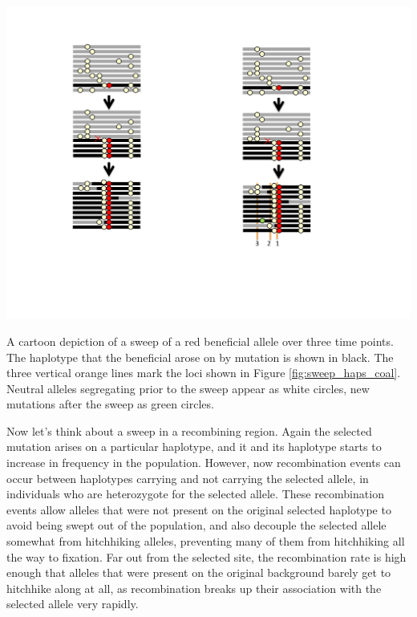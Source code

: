 \begin{marginfigure}
\begin{center}
\includegraphics[width= 0.5 \textwidth]{figures/Hitchhiking/recom_haps_sweep.pdf}
\end{center}
\caption{A cartoon depiction of a sweep of a red beneficial allele over three time points. The haplotype that the beneficial arose on by mutation is shown in black. The three vertical orange lines mark the loci shown in Figure \ref{fig:sweep_haps_coal}. Neutral alleles segregating prior to the sweep appear as white circles, new mutations after the sweep as green circles.} \label{fig:sweep_haps}
\end{marginfigure}
Now let's think about a sweep in a recombining region. Again the
selected mutation arises on a particular haplotype, and it and its
haplotype starts to increase in frequency in the population. However,
now recombination events can occur between haplotypes carrying and not
carrying the selected allele, in individuals who are heterozygote for
the selected allele. These recombination events allow alleles that
were not present on the original selected haplotype to avoid being
swept out of the population, and also decouple the selected allele
somewhat from hitchhiking alleles, preventing many of them from hitchhiking all the way to fixation. Far out from the selected site, the recombination
rate is high enough that alleles that were present on the original
background barely get to hitchhike along at all, as recombination breaks up their association with the selected allele very rapidly.

